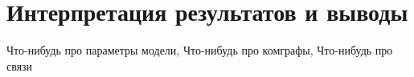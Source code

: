 \chapter{Интерпретация результатов и выводы} \label{analysis}
Что-нибудь про параметры модели,
Что-нибудь про комграфы,
Что-нибудь про связи
\clearpage
